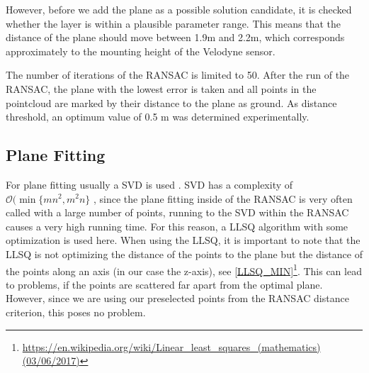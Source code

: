 \documentclass[11pt,oneside,openright]{mpreport}
\begin{document}
However, before we add the plane as a possible solution candidate, it is checked whether the layer is within a plausible parameter range.
This means that the distance of the plane should move between 1.9m and 2.2m, which corresponds approximately to the mounting height of the Velodyne sensor.

The number of iterations of the \ac{RANSAC} is limited to 50. After the run of the \ac{RANSAC}, the plane with the lowest error is taken and all points in the
pointcloud are marked by their distance to the plane as ground. As distance threshold, an optimum value of 0.5 m was determined experimentally.


\subsection{Plane Fitting}
\label{subssec:planefitting}



For plane fitting usually a \ac{SVD} is used \cite{Nurunnabi2012,Ram2007,Soderkvist2009}. SVD has a complexity of $\mathcal{O}(\min\{mn^2, m^2n\}$ \cite{Holmes2007}, since the plane fitting inside
of the \ac{RANSAC} is very often called with a large number of points, running to the \ac{SVD} within the \ac{RANSAC} causes a very high running time.
For this reason, a \ac{LLSQ} algorithm with some optimization is used here.
When using the \ac{LLSQ}, it is important to note that the \ac{LLSQ} is not optimizing the distance of the points to the plane but the distance of the points along an axis (in our case the z-axis),
see \cref{LLSQ_MIN}\footnote{\url{https://en.wikipedia.org/wiki/Linear_least_squares_(mathematics) (03/06/2017)}}. This can lead to problems, if the points are scattered far apart from the optimal plane.
However, since we are using our preselected points from the \ac{RANSAC} distance criterion, this poses no problem.
\end{document}
